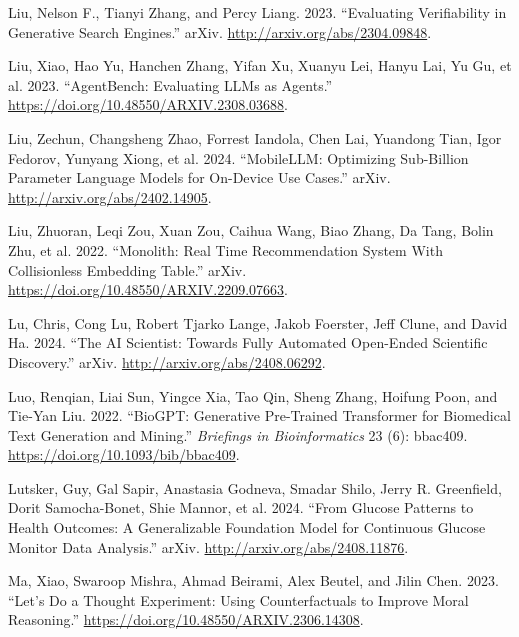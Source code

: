 \documentclass[
  Letterpaper,
]{scrbook}
\newlength{\cslhangindent}
\newenvironment{CSLReferences}[2] %
 {\begin{list}{}{%
  \setlength{\itemindent}{0pt}
  \setlength{\leftmargin}{0pt}
  \setlength{\parsep}{0pt}
  \ifodd #1
   \setlength{\leftmargin}{\cslhangindent}
   \setlength{\itemindent}{-1\cslhangindent}
  \fi
  \setlength{\itemsep}{#2\baselineskip}}}
 {\end{list}}
\begin{document}
\begin{CSLReferences}{1}{0}
Liu, Nelson F., Tianyi Zhang, and Percy Liang. 2023. {``Evaluating
{Verifiability} in {Generative} {Search} {Engines}.''} arXiv.
\url{http://arxiv.org/abs/2304.09848}.

Liu, Xiao, Hao Yu, Hanchen Zhang, Yifan Xu, Xuanyu Lei, Hanyu Lai, Yu
Gu, et al. 2023. {``{AgentBench}: {Evaluating} {LLMs} as {Agents}.''}
\url{https://doi.org/10.48550/ARXIV.2308.03688}.

Liu, Zechun, Changsheng Zhao, Forrest Iandola, Chen Lai, Yuandong Tian,
Igor Fedorov, Yunyang Xiong, et al. 2024. {``{MobileLLM}: {Optimizing}
{Sub}-Billion {Parameter} {Language} {Models} for {On}-{Device} {Use}
{Cases}.''} arXiv. \url{http://arxiv.org/abs/2402.14905}.

Liu, Zhuoran, Leqi Zou, Xuan Zou, Caihua Wang, Biao Zhang, Da Tang,
Bolin Zhu, et al. 2022. {``Monolith: {Real} {Time} {Recommendation}
{System} {With} {Collisionless} {Embedding} {Table}.''} arXiv.
\url{https://doi.org/10.48550/ARXIV.2209.07663}.

Lu, Chris, Cong Lu, Robert Tjarko Lange, Jakob Foerster, Jeff Clune, and
David Ha. 2024. {``The {AI} {Scientist}: {Towards} {Fully} {Automated}
{Open}-{Ended} {Scientific} {Discovery}.''} arXiv.
\url{http://arxiv.org/abs/2408.06292}.

Luo, Renqian, Liai Sun, Yingce Xia, Tao Qin, Sheng Zhang, Hoifung Poon,
and Tie-Yan Liu. 2022. {``{BioGPT}: Generative Pre-Trained Transformer
for Biomedical Text Generation and Mining.''} \emph{Briefings in
Bioinformatics} 23 (6): bbac409.
\url{https://doi.org/10.1093/bib/bbac409}.

Lutsker, Guy, Gal Sapir, Anastasia Godneva, Smadar Shilo, Jerry R.
Greenfield, Dorit Samocha-Bonet, Shie Mannor, et al. 2024. {``From
{Glucose} {Patterns} to {Health} {Outcomes}: {A} {Generalizable}
{Foundation} {Model} for {Continuous} {Glucose} {Monitor} {Data}
{Analysis}.''} arXiv. \url{http://arxiv.org/abs/2408.11876}.

Ma, Xiao, Swaroop Mishra, Ahmad Beirami, Alex Beutel, and Jilin Chen.
2023. {``Let's {Do} a {Thought} {Experiment}: {Using} {Counterfactuals}
to {Improve} {Moral} {Reasoning}.''}
\url{https://doi.org/10.48550/ARXIV.2306.14308}.


\end{CSLReferences}
\end{document}
